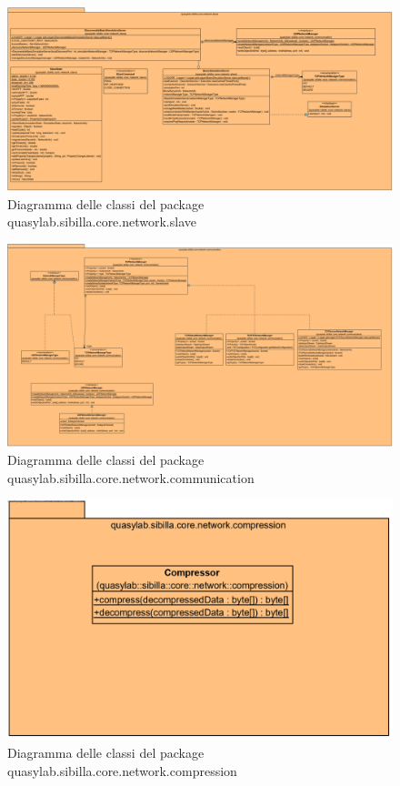 \begin{figure}[h!]
  \includegraphics[width=\linewidth]{images/quasylab.sibilla.core.network.slave.png}
  \captionsetup{justification=centering}
  \caption{Diagramma delle classi del package quasylab.sibilla.core.network.slave}
\end{figure}

\begin{figure}[h!]
  \includegraphics[width=\linewidth]{images/quasylab.sibilla.core.network.communication.png}
  \captionsetup{justification=centering}
  \caption{Diagramma delle classi del package quasylab.sibilla.core.network.communication}
\end{figure}

\begin{figure}[h!]
  \includegraphics[width=\linewidth]{images/quasylab.sibilla.core.network.compression.png}
  \captionsetup{justification=centering}
  \caption{Diagramma delle classi del package quasylab.sibilla.core.network.compression}
\end{figure}

